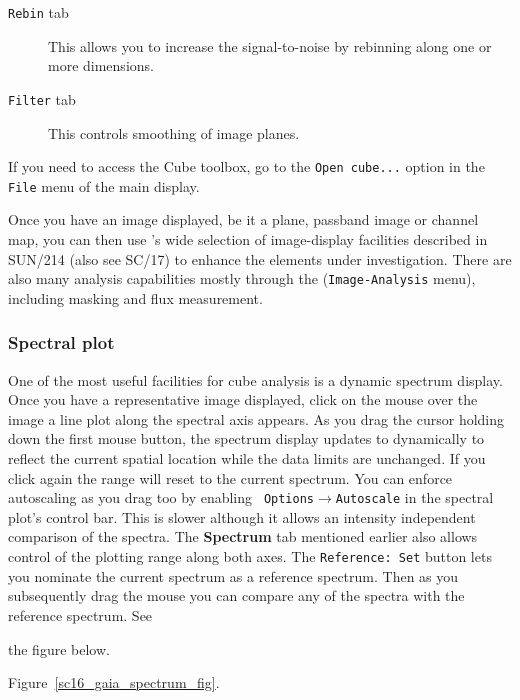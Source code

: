 \documentclass[twoside,11pt]{article}
\newcommand{\htmlref}[2]{#1}
\newcommand{\latex}[1]{#1}
\newcommand{\xref}[3]{#1}
\begin{document}
{\begin{description}
\item[{\tt Rebin} tab]
This allows you to increase the signal-to-noise by rebinning along one or
more dimensions.
 
\item[{\tt Filter} tab]
This controls smoothing of image planes.

\end{description}

If you need to access the Cube toolbox, go to the {\tt Open cube...}
option in the {\tt File} menu of the main display.

Once you have an image displayed, be it a plane, passband image or
channel map, you can then use \GAIA's wide selection of 
\xref{image-display facilities}{sun214}{image_display_capabilities}
\latex{described in SUN/214} (also see \xref{SC/17}{sc17}{}) to
enhance the elements under investigation.  There are also many
\xref{analysis capabilities}{sun214}{image_analysis_capabilities}
mostly through the ({\tt Image-Analysis} menu), including masking and
flux measurement.

\subsubsection{Spectral plot\label{sc16_spectral_plot}}

One of the most useful facilities for cube analysis is a dynamic
spectrum display.  Once you have a representative image displayed,
click on the mouse over the image a line plot along the spectral axis
appears.  As you drag the cursor holding down the first mouse button,
the spectrum display updates to dynamically to reflect the current
spatial location while the data limits are unchanged.  If you click
again the range will reset to the current spectrum.  You can enforce
autoscaling as you drag too by enabling {\tt
Options$\rightarrow$Autoscale} in the spectral plot's control bar.
This is slower although it allows an intensity independent comparison
of the spectra.  The {\bf Spectrum} tab \htmlref{mentioned
earlier}{sc16_cube_toolbox} also allows control of the plotting range
along both axes. The {\tt Reference: Set} button lets you nominate the
current spectrum as a reference spectrum.  Then as you subsequently
drag the mouse you can compare any of the spectra with the reference
spectrum.  See 
\begin{htmlonly} 
the figure below.
\end{htmlonly} 
\latex{Figure~\ref{sc16_gaia_spectrum_fig}.}
\newpage

}
\end{document}
